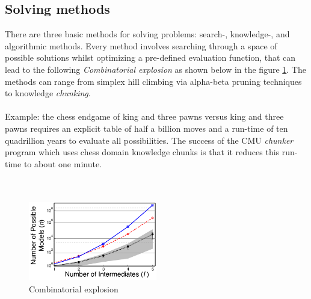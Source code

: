 \subsection{Solving methods}
There are three basic methods for solving problems: 
search-, knowledge-, and algorithmic methods. 
Every method involves searching through a space of possible
 solutions whilst optimizing a pre-defined evaluation function, 
 that can lead to the following \emph{Combinatorial explosion} as shown below in the figure \ref{fig:combiexplo}. 
 The methods can range from simplex hill climbing via alpha-beta
  pruning techniques to knowledge \emph{chunking}. 
\\
\\
Example: the chess endgame of king and three pawns versus king 
and three pawns requires an explicit table of half a billion 
moves and a run-time of ten quadrillion years to evaluate all
possibilities. The success of the CMU \emph{chunker} program which
uses chess domain knowledge chunks is that it reduces this
run-time to about one minute.
\\
\\
\\
\begin{figure}[htb]
    \centering
    \includegraphics[width=0.5\textwidth]{pics/combiexplo.png}
    \caption{Combinatorial explosion} 
    \label{fig:combiexplo}
\end{figure}

